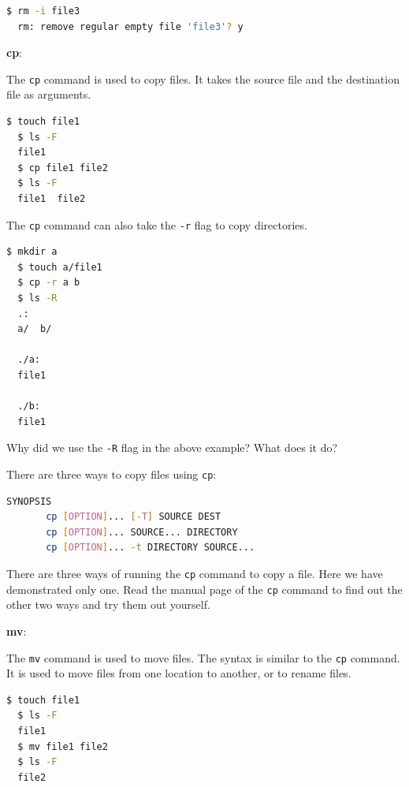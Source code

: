 \begin{lstlisting}[language=bash]
  $ rm -i file3
  rm: remove regular empty file 'file3'? y
\end{lstlisting}

\textbf{cp}:

The \texttt{cp} command is used to copy files.
It takes the source file and the destination file as arguments.

\begin{lstlisting}[language=bash]
  $ touch file1
  $ ls -F
  file1
  $ cp file1 file2
  $ ls -F
  file1  file2
\end{lstlisting}

The \texttt{cp} command can also take the \texttt{-r} flag to copy directories.

\begin{lstlisting}[language=bash]
  $ mkdir a
  $ touch a/file1
  $ cp -r a b
  $ ls -R
  .:
  a/  b/

  ./a:
  file1

  ./b:
  file1
\end{lstlisting}

\begin{exercise}
  Why did we use the \texttt{-R} flag in the above example? What does it do?
\end{exercise}

There are three ways to copy files using \texttt{cp}:

\begin{lstlisting}[language=bash]
SYNOPSIS
       cp [OPTION]... [-T] SOURCE DEST
       cp [OPTION]... SOURCE... DIRECTORY
       cp [OPTION]... -t DIRECTORY SOURCE...
\end{lstlisting}

\begin{exercise}
  There are three ways of running the \texttt{cp} command to copy a file.
  Here we have demonstrated only one.
  Read the manual page of the \texttt{cp} command to find out the other two ways and try them out yourself.
\end{exercise}

\textbf{mv}:

The \texttt{mv} command is used to move files.
The syntax is similar to the \texttt{cp} command.
It is used to move files from one location to another, or to rename files.

\begin{lstlisting}[language=bash]
  $ touch file1
  $ ls -F
  file1
  $ mv file1 file2
  $ ls -F
  file2
\end{lstlisting}

